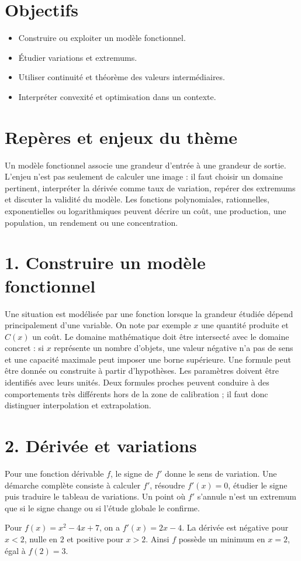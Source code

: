 \section{Objectifs}
\begin{itemize}
\item Construire ou exploiter un modèle fonctionnel.
\item Étudier variations et extremums.
\item Utiliser continuité et théorème des valeurs intermédiaires.
\item Interpréter convexité et optimisation dans un contexte.
\end{itemize}
\section{Repères et enjeux du thème}
Un modèle fonctionnel associe une grandeur d'entrée à une grandeur de sortie. L'enjeu n'est pas seulement de calculer une image : il faut choisir un domaine pertinent, interpréter la dérivée comme taux de variation, repérer des extremums et discuter la validité du modèle. Les fonctions polynomiales, rationnelles, exponentielles ou logarithmiques peuvent décrire un coût, une production, une population, un rendement ou une concentration.
\section{1. Construire un modèle fonctionnel}
Une situation est modélisée par une fonction lorsque la grandeur étudiée dépend principalement d'une variable. On note par exemple $x$ une quantité produite et $C(x)$ un coût. Le domaine mathématique doit être intersecté avec le domaine concret : si $x$ représente un nombre d'objets, une valeur négative n'a pas de sens et une capacité maximale peut imposer une borne supérieure.
Une formule peut être donnée ou construite à partir d'hypothèses. Les paramètres doivent être identifiés avec leurs unités. Deux formules proches peuvent conduire à des comportements très différents hors de la zone de calibration ; il faut donc distinguer interpolation et extrapolation.
\section{2. Dérivée et variations}
Pour une fonction dérivable $f$, le signe de $f'$ donne le sens de variation. Une démarche complète consiste à calculer $f'$, résoudre $f'(x)=0$, étudier le signe puis traduire le tableau de variations. Un point où $f'$ s'annule n'est un extremum que si le signe change ou si l'étude globale le confirme.
\begin{exemple}
Pour $f(x)=x^2-4x+7$, on a $f'(x)=2x-4$. La dérivée est négative pour $x<2$, nulle en $2$ et positive pour $x>2$. Ainsi $f$ possède un minimum en $x=2$, égal à $f(2)=3$.
\end{exemple}
